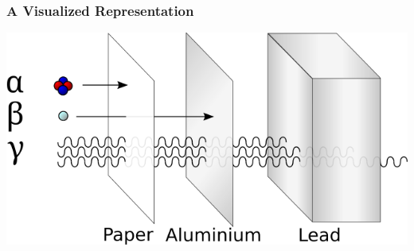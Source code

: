 \documentclass[aspectratio=169]{beamer}
\begin{document}
\begin{frame}
    \frametitle{A Visualized Representation}
    \includegraphics[width=1\textwidth]{images/Alfa_beta_gamma_radiation_penetration.svg.png}
\end{frame}
\end{document}
